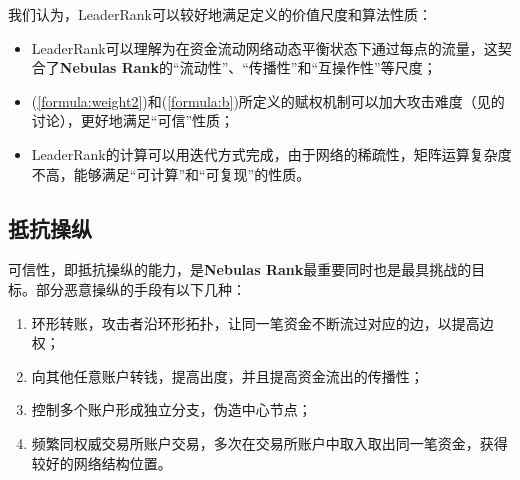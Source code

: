 我们认为，LeaderRank可以较好地满足定义的价值尺度和算法性质：
\begin{itemize}
	\item LeaderRank可以理解为在资金流动网络动态平衡状态下通过每点的流量，这契合了\textbf{Nebulas Rank}的“流动性”、“传播性”和“互操作性”等尺度；
	\item (\ref{formula:weight2})和(\ref{formula:b})所定义的赋权机制可以加大攻击难度（见的讨论），更好地满足“可信”性质；
	\item LeaderRank的计算可以用迭代方式完成，由于网络的稀疏性，矩阵运算复杂度不高，能够满足“可计算”和“可复现”的性质。
\end{itemize}


\subsection{抵抗操纵}\label{subsec:robust}

可信性，即抵抗操纵的能力，是\textbf{Nebulas Rank}最重要同时也是最具挑战的目标。部分恶意操纵的手段有以下几种：
\begin{enumerate}
	\item 环形转账，攻击者沿环形拓扑，让同一笔资金不断流过对应的边，以提高边权；
	\item 向其他任意账户转钱，提高出度，并且提高资金流出的传播性；
	\item 控制多个账户形成独立分支，伪造中心节点；
	\item 频繁同权威交易所账户交易，多次在交易所账户中取入取出同一笔资金，获得较好的网络结构位置。
\end{enumerate}

